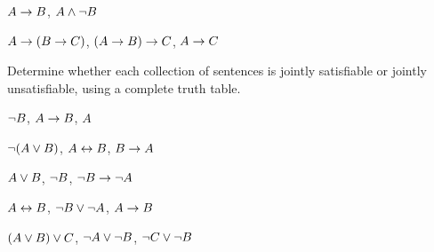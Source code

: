 \begin{compactlist}
% 
%


\item $A \rightarrow B$, $A \wedge \neg B$\vspace{.5ex} %

\item $A \rightarrow (B \rightarrow C)$, $(A \rightarrow B) \rightarrow C$, $A \rightarrow C$\vspace{.5ex} %

\end{compactlist}

\noindent\problempart
\label{pr.TT.satisfiable3}
Determine whether each collection of sentences is jointly satisfiable or jointly unsatisfiable, using a complete truth table.
\begin{compactlist}
\item $\neg B$, $A \rightarrow B$, $A$ \vspace{.5ex}%
\item $\neg(A \vee B)$, $A \leftrightarrow B$, $B \rightarrow A$\vspace{.5ex} %
\item $A \vee B$, $\neg B$, $\neg B \rightarrow \neg A$\vspace{.5ex} %
\item $A \leftrightarrow B$, $\neg B \vee \neg A$, $A \rightarrow B$\vspace{.5ex} %
\item $(A \vee B) \vee C$, $\neg A \vee \neg B$, $\neg C \vee \neg B$\vspace{.5ex} %
\end{compactlist}




